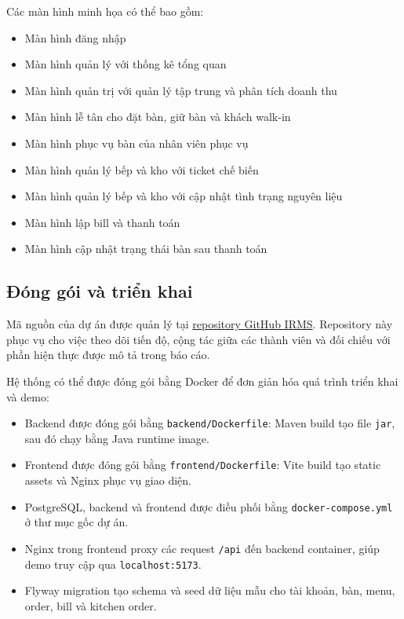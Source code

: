 \documentclass[12pt,a4paper]{article}
\begin{document}
Các màn hình minh họa có thể bao gồm:
\begin{itemize}
    \item Màn hình đăng nhập
    \item Màn hình quản lý với thống kê tổng quan
    \item Màn hình quản trị với quản lý tập trung và phân tích doanh thu
    \item Màn hình lễ tân cho đặt bàn, giữ bàn và khách walk-in
    \item Màn hình phục vụ bàn của nhân viên phục vụ
    \item Màn hình quản lý bếp và kho với ticket chế biến
    \item Màn hình quản lý bếp và kho với cập nhật tình trạng nguyên liệu
    \item Màn hình lập bill và thanh toán
    \item Màn hình cập nhật trạng thái bàn sau thanh toán
\end{itemize}

\subsection{Đóng gói và triển khai}

Mã nguồn của dự án được quản lý tại \href{https://github.com/KeHamTruyen/IRMS}{repository GitHub IRMS}. Repository này phục vụ cho việc theo dõi tiến độ, cộng tác giữa các thành viên và đối chiếu với phần hiện thực được mô tả trong báo cáo.

Hệ thống có thể được đóng gói bằng Docker để đơn giản hóa quá trình triển khai và demo:
\begin{itemize}
    \item Backend được đóng gói bằng \texttt{backend/Dockerfile}: Maven build tạo file \texttt{jar}, sau đó chạy bằng Java runtime image.
    \item Frontend được đóng gói bằng \texttt{frontend/Dockerfile}: Vite build tạo static assets và Nginx phục vụ giao diện.
    \item PostgreSQL, backend và frontend được điều phối bằng \texttt{docker-compose.yml} ở thư mục gốc dự án.
    \item Nginx trong frontend proxy các request \texttt{/api} đến backend container, giúp demo truy cập qua \texttt{localhost:5173}.
    \item Flyway migration tạo schema và seed dữ liệu mẫu cho tài khoản, bàn, menu, order, bill và kitchen order.
\end{itemize}
\end{document}
